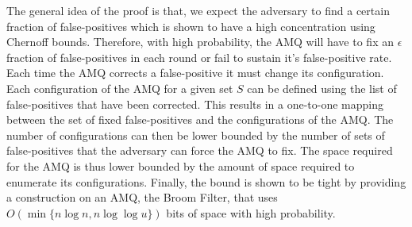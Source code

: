 \documentclass[../paper.tex]{subfiles}
\begin{document}
	The general idea of the proof is that, we expect the adversary to find a certain 
	fraction of false-positives which is shown to have a high concentration using Chernoff
	bounds.  Therefore, with high probability, the AMQ will have to fix an $\epsilon$ fraction
	of false-positives in each round or fail to sustain it's false-positive rate.  Each time the 
	AMQ corrects a false-positive it must change its configuration.  Each configuration of the 
	AMQ for a given set $S$ can be defined using the list of false-positives that have been
	corrected.  This results in a one-to-one mapping between the set of fixed false-positives 
	and the configurations of the AMQ.  The number of configurations can then be lower 
	bounded by the number of sets of false-positives that the adversary can force the AMQ
	to fix.  The space required for the AMQ is thus lower bounded by the amount of space 
	required to enumerate its configurations.  Finally, the bound is shown to be tight by 
	providing a construction on an AMQ, the Broom Filter, that uses $O(\min \{n\log n, 
	n\log\log u\})$ bits of space with high probability. 
	
	
\end{document}

